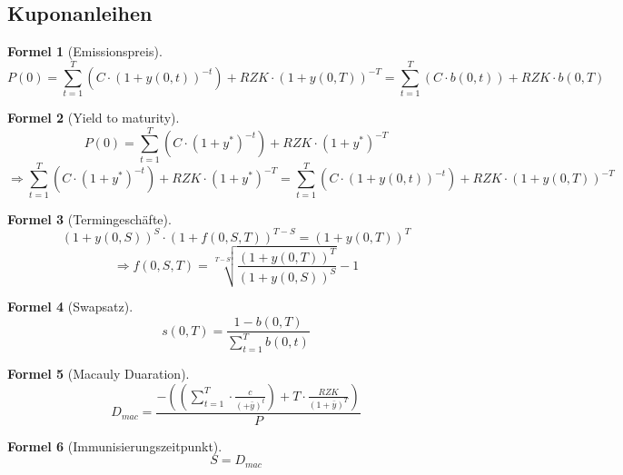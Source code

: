 \documentclass[a4paper]{article}
\theoremstyle{break}
\newtheorem{formula}{Formel}[section]
\newcommand{\st}{\sum_{t=1}^{T}}
\begin{document}
    \subsection{Kuponanleihen}
    \begin{formula}[Emissionspreis]
        $$P(0) = \st(C \cdot (1+y(0,t))^{-t})  + RZK \cdot (1 + y(0,T))^{-T} = \st(C \cdot b(0,t)) + RZK \cdot b(0,T)$$
    \end{formula}
    \begin{formula}[Yield to maturity]
        $$P(0) = \st(C \cdot (1 + y^{*})^{-t})  + RZK \cdot (1 + y^{*})^{-T}$$
        $$\Rightarrow \st(C \cdot (1 + y^{*})^{-t})  + RZK \cdot (1 + y^{*})^{-T} = \st(C \cdot (1+y(0,t))^{-t})  + RZK \cdot (1 + y(0,T))^{-T}$$
    \end{formula}
    \begin{formula}[Termingeschäfte]
        $$(1 + y(0,S))^S \cdot (1 + f(0,S,T))^{T-S} = (1 + y(0,T))^T$$
        $$\Rightarrow f(0,S,T) = \sqrt[T-S]{\frac{(1 + y(0,T))^T}{(1 + y(0,S))^S}} - 1$$
    \end{formula}
    \begin{formula}[Swapsatz]
        $$s(0,T) = \frac{1 - b(0,T)}{\sum_{t=1}^{T}b(0,t)}$$
    \end{formula}
    \begin{formula}[Macauly Duaration]
        $$D_{mac} = \frac{- ((\sum_{t=1}^{T} \cdot \frac{c}{(+ \bar{y})^t}) + T \cdot \frac{RZK}{(1 + \bar{y})^T})}{P}$$  
    \end{formula}
    \begin{formula}[Immunisierungszeitpunkt]
        $$ S = D_{mac}$$
    \end{formula}
\end{document}
